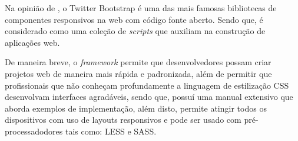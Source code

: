 Na opinião de , o \acs{Twitter
Bootstrap} é uma das mais famosas bibliotecas de componentes responsivos na web
com código fonte aberto. Sendo que, é considerado como uma coleção de
\textit{scripts} que auxiliam na construção de aplicações web.

De maneira breve, o \textit{framework} permite que desenvolvedores possam criar
projetos web de maneira mais rápida e padronizada, além de permitir que
profissionais que não conheçam profundamente a linguagem de estilização 
\acs{CSS} desenvolvam interfaces agradáveis, sendo que, possuí uma manual 
extensivo que aborda exemplos de implementação, além disto, permite atingir
todos os dispositivos com uso de layouts responsivos e pode ser usado com
pré-processadodores tais como: \ac{LESS} e \ac{SASS}.

